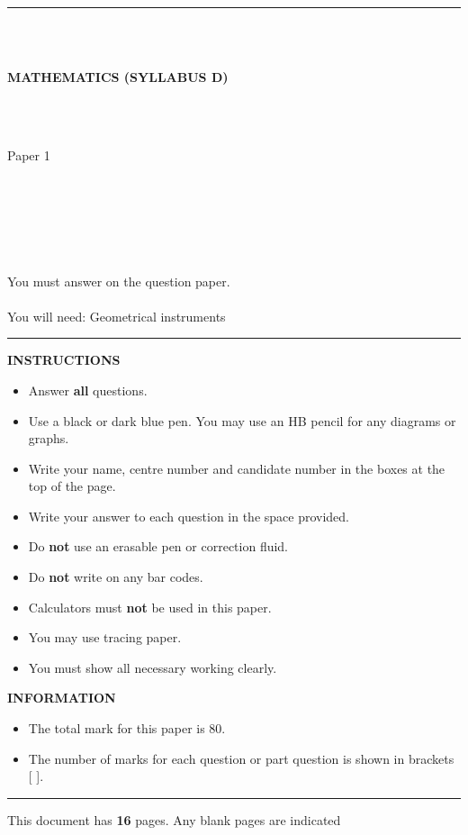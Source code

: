  \\
\rule{\textwidth}{0.2pt} 
 \\
\\
\begin{minipage}{.5\textwidth}
\textbf{MATHEMATICS (SYLLABUS D)}
\end{minipage}
\begin{minipage}{.5\textwidth}
{}
\end{minipage}
\\ \\
\begin{minipage}{.5\textwidth}
Paper 1
\end{minipage}
\begin{minipage}{.5\textwidth}
{}
\end{minipage}
\\  \\
\begin{minipage}{.5\textwidth}
~
\end{minipage}
\begin{minipage}{.5\textwidth}
{}
\end{minipage}
\\
You must answer on the question paper.\\
\\
You will need: Geometrical instruments\\ 
\rule{\textwidth}{0.2pt}
\textbf{INSTRUCTIONS}
\begin{itemize}
\setlength\itemsep{0em}
    \item Answer \textbf{all} questions.
 \item Use a black or dark blue pen. You may use an HB pencil for any diagrams or graphs.
 \item Write your name, centre number and candidate number in the boxes at the top of the page.
 \item Write your answer to each question in the space provided.
 \item Do \textbf{not} use an erasable pen or correction fluid.
 \item Do \textbf{not} write on any bar codes.
 \item Calculators must \textbf{not} be used in this paper.
 \item You may use tracing paper.
 \item You must show all necessary working clearly.
\end{itemize}
\textbf{INFORMATION}
\begin{itemize}
\setlength\itemsep{0em}
    \item The total mark for this paper is 80.
\item The number of marks for each question or part question is shown in brackets [ ].
\end{itemize}
\vspace{30pt}
\rule{\textwidth}{0.2pt} 
\begin{center}
    This document has \textbf{16} pages. Any blank pages are indicated
\end{center}
